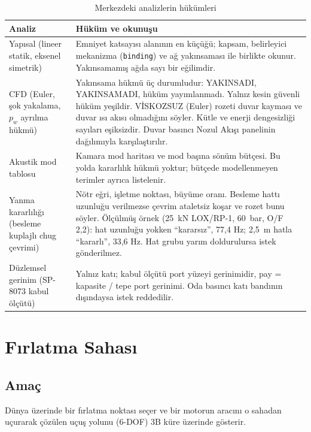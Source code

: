 \documentclass[11pt,a4paper]{article}
\newcommand{\ui}[1]{\textsf{#1}}
\newcommand{\kod}[1]{\texttt{#1}}
\begin{document}
\begin{table}[htbp]
\centering\small
\caption{Merkezdeki analizlerin hükümleri}\label{tab:merkez-analiz}
\begin{tabular}{@{}>{\raggedright\arraybackslash}p{4.2cm}>{\raggedright\arraybackslash}p{11.4cm}@{}}
\toprule
\textbf{Analiz} & \textbf{Hüküm ve okunuşu} \\
\midrule
Yapısal (lineer statik, eksenel simetrik) & Emniyet katsayısı alanının en küçüğü; kapsam, belirleyici mekanizma (\kod{binding}) ve ağ yakınsaması ile birlikte okunur. Yakınsamamış ağda sayı bir eğilimdir. \\
CFD (Euler, şok yakalama, $p_w$ ayrılma hükmü) & Yakınsama hükmü üç durumludur: \ui{YAKINSADI}, \ui{YAKINSAMADI}, hüküm yayımlanmadı. Yalnız kesin güvenli hüküm yeşildir. \ui{VİSKOZSUZ (Euler)} rozeti duvar kayması ve duvar ısı akısı olmadığını söyler. Kütle ve enerji dengesizliği sayıları eşiksizdir. Duvar basıncı Nozul Akışı panelinin dağılımıyla karşılaştırılır. \\
Akustik mod tablosu & Kamara mod haritası ve mod başına sönüm bütçesi. Bu yolda kararlılık hükmü yoktur; bütçede modellenmeyen terimler ayrıca listelenir. \\
Yanma kararlılığı (besleme kuplajlı chug çevrimi) & Nötr eğri, işletme noktası, büyüme oranı. Besleme hattı uzunluğu verilmezse çevrim ataletsiz koşar ve rozet bunu söyler. Ölçülmüş örnek (25~kN LOX/RP-1, 60~bar, O/F 2,2): hat uzunluğu yokken ``kararsız'', 77,4 Hz; 2,5~m hatla ``kararlı'', 33,6 Hz. Hat grubu yarım doldurulursa istek gönderilmez. \\
Düzlemsel gerinim (SP-8073 kabul ölçütü) & Yalnız katı; kabul ölçütü port yüzeyi gerinimidir, pay = kapasite / tepe port gerinimi. Oda basıncı katı bandının dışındaysa istek reddedilir. \\
\bottomrule
\end{tabular}
\end{table}

\section{Fırlatma Sahası}\label{sec:saha}

\subsection{Amaç}

Dünya üzerinde bir fırlatma noktası seçer ve bir motorun aracını o sahadan
uçurarak çözülen uçuş yolunu (6-DOF) 3B küre üzerinde gösterir.
\end{document}
